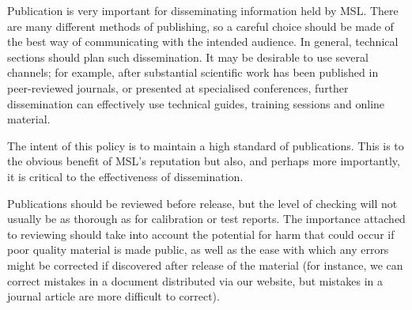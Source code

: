 Publication is very important for disseminating information held by MSL. There are many different methods of publishing, so a careful choice should be made of the best way of communicating with the intended audience. In general, technical sections should plan such dissemination. It may be desirable to use several channels; for example, after substantial scientific work has been published in peer-reviewed journals, or presented at specialised conferences, further dissemination can effectively use technical guides, training sessions and online material. 

The intent of this policy is to maintain a high standard of publications. This is to the obvious benefit of MSL’s reputation but also, and perhaps more importantly, it is critical to the effectiveness of dissemination. 

Publications should be reviewed before release, but the level of checking will not usually be as thorough as for calibration or test reports. The importance attached to reviewing should take into account the potential for harm that could occur if poor quality material is made public, as well as the ease with which any errors might be corrected if discovered after release of the material (for instance, we can correct mistakes in a document distributed via our website, but mistakes in a journal article are more difficult to correct).  

